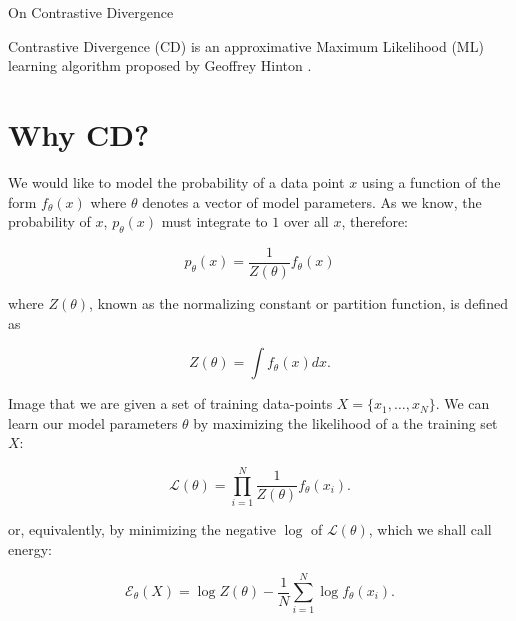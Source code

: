 \documentclass[11pt]{article}
\begin{document}
	
\begin{center}
{\LARGE On Contrastive Divergence} 
\end{center}

Contrastive Divergence (CD) is an approximative Maximum Likelihood (ML) learning algorithm proposed by Geoffrey Hinton \cite{Hinton:2002, carreiraperpinan:2005}.


\section{Why CD?}

We would like to model the probability of a data point $x$ using a function of the form $f_\theta(x)$ where $\theta$ denotes a vector of model parameters. As we know, the probability of $x$, $p_\theta(x)$ must integrate to $1$ over all $x$, therefore:

\begin{equation}
p_\theta(x) = \frac{1}{Z(\theta)}f_\theta(x)
\end{equation}

where $Z(\theta)$, known as the normalizing constant or partition function, is defined as

\begin{equation}
Z(\theta) = \int f_\theta(x) dx.
\label{eq:partition}
\end{equation}

Image that we are given a set of training data-points $X=\{x_1,\ldots,x_N\}$. We can learn our model parameters $\theta$ by maximizing the likelihood of a the training set $X$:

\begin{equation}
\mathcal{L} (\theta) = \prod_{i=1}^N \frac{1}{Z(\theta)} f_\theta(x_i).
\end{equation}

or, equivalently, by minimizing the negative $\log$ of $\mathcal{L}(\theta)$, which we shall call energy:

\begin{equation}
\mathcal{E}_\theta(X) = \log Z(\theta) - \frac{1}{N} \sum_{i=1}^N \log f_\theta(x_i).
\label{eq:energy}
\end{equation}
\end{document}
